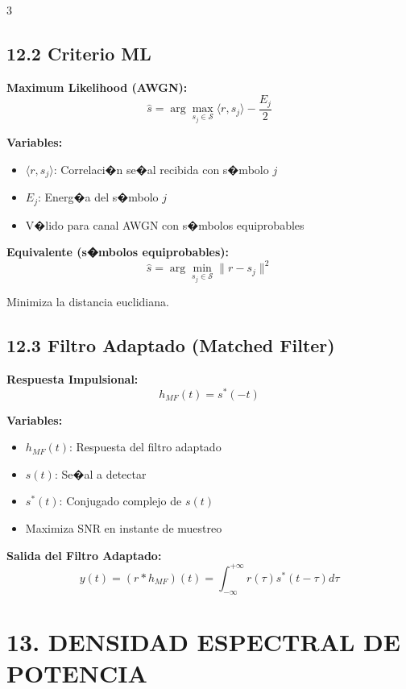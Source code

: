 ﻿\documentclass[8pt,a4paper]{article}
\begin{document}
\begin{multicols}{3}
\vspace{-2mm}
\subsection*{\small 12.2 Criterio ML}
\vspace{-2mm}

\textbf{Maximum Likelihood (AWGN):}
\[
\hat{s} = \arg\max_{s_j \in \mathcal{S}} \langle r, s_j \rangle - \frac{E_j}{2}
\]

\textbf{Variables:}
\begin{itemize}[leftmargin=*,itemsep=0pt]
    \item $\langle r, s_j \rangle$: Correlaci�n se�al recibida con s�mbolo $j$
    \item $E_j$: Energ�a del s�mbolo $j$
    \item V�lido para canal AWGN con s�mbolos equiprobables
\end{itemize}

\textbf{Equivalente (s�mbolos equiprobables):}
\[
\hat{s} = \arg\min_{s_j \in \mathcal{S}} \|r - s_j\|^2
\]

Minimiza la distancia euclidiana.

\vspace{-2mm}
\subsection*{\small 12.3 Filtro Adaptado (Matched Filter)}
\vspace{-2mm}

\textbf{Respuesta Impulsional:}
\[
h_{MF}(t) = s^*(-t)
\]

\textbf{Variables:}
\begin{itemize}[leftmargin=*,itemsep=0pt]
    \item $h_{MF}(t)$: Respuesta del filtro adaptado
    \item $s(t)$: Se�al a detectar
    \item $s^*(t)$: Conjugado complejo de $s(t)$
    \item Maximiza SNR en instante de muestreo
\end{itemize}

\textbf{Salida del Filtro Adaptado:}
\[
y(t) = (r * h_{MF})(t) = \int_{-\infty}^{+\infty} r(\tau) s^*(t-\tau) d\tau
\]

\vspace{-2mm}
\section*{\color{sectioncolor}\normalsize 13. DENSIDAD ESPECTRAL DE POTENCIA}
\vspace{-3mm}


\end{multicols}
\end{document}
